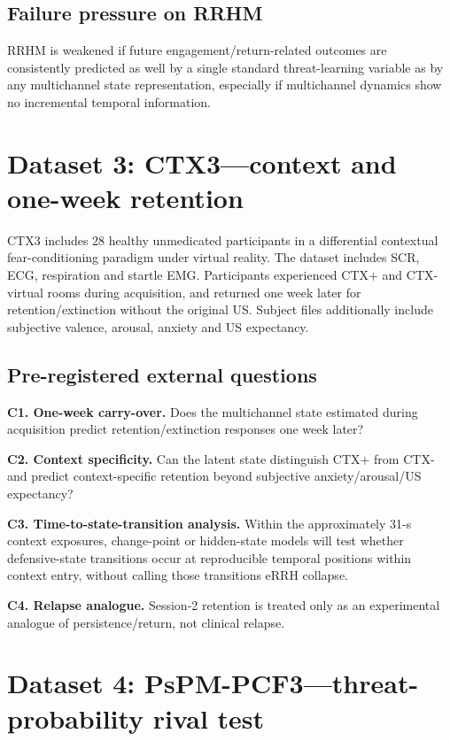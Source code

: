 \documentclass[11pt]{article}
\begin{document}
\subsection{Failure pressure on RRHM}

RRHM is weakened if future engagement/return-related outcomes are consistently predicted as well by a single standard threat-learning variable as by any multichannel state representation, especially if multichannel dynamics show no incremental temporal information.

\section{Dataset 3: CTX3---context and one-week retention}

CTX3 includes 28 healthy unmedicated participants in a differential contextual fear-conditioning paradigm under virtual reality. The dataset includes SCR, ECG, respiration and startle EMG. Participants experienced CTX+ and CTX- virtual rooms during acquisition, and returned one week later for retention/extinction without the original US. Subject files additionally include subjective valence, arousal, anxiety and US expectancy.

\subsection{Pre-registered external questions}

\textbf{C1. One-week carry-over.} Does the multichannel state estimated during acquisition predict retention/extinction responses one week later?

\textbf{C2. Context specificity.} Can the latent state distinguish CTX+ from CTX- and predict context-specific retention beyond subjective anxiety/arousal/US expectancy?

\textbf{C3. Time-to-state-transition analysis.} Within the approximately 31-s context exposures, change-point or hidden-state models will test whether defensive-state transitions occur at reproducible temporal positions within context entry, without calling those transitions eRRH collapse.

\textbf{C4. Relapse analogue.} Session-2 retention is treated only as an experimental analogue of persistence/return, not clinical relapse.

\section{Dataset 4: PsPM-PCF3---threat-probability rival test}
\end{document}
